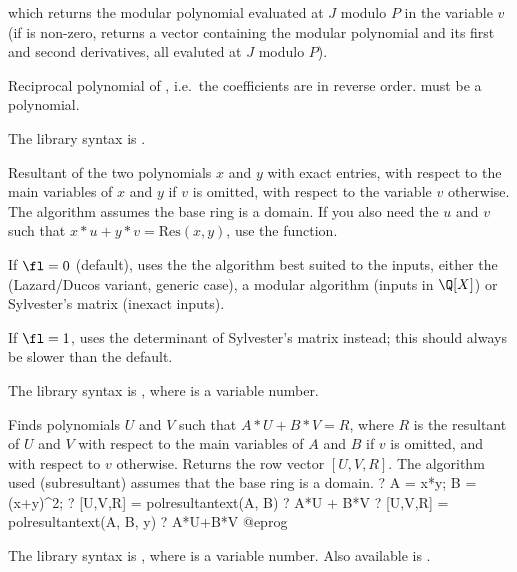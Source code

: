  which returns the modular polynomial evaluated
at $J$ modulo $P$ in the variable $v$ (if  is
non-zero, returns a vector containing the modular polynomial and its
first and second derivatives, all evaluted at $J$ modulo $P$).

\label{se:polrecip}
Reciprocal polynomial of , i.e.~the coefficients are in
reverse order.  must be a polynomial.

The library syntax is .

\label{se:polresultant}
Resultant of the two
polynomials $x$ and $y$ with exact entries, with respect to the main
variables of $x$ and $y$ if $v$ is omitted, with respect to the variable $v$
otherwise. The algorithm assumes the base ring is a domain. If you also need
the $u$ and $v$ such that $x*u + y*v = \text{Res}(x,y)$, use the
 function.

If $\fl=0$ (default), uses the the algorithm best suited to the inputs,
either the  (Lazard/Ducos variant, generic case),
a modular algorithm (inputs in $\Q[X]$) or Sylvester's matrix (inexact
inputs).

If $\fl=1$, uses the determinant of Sylvester's matrix instead; this should
always be slower than the default.

The library syntax is , where  is a variable number.

\label{se:polresultantext}
Finds polynomials $U$ and $V$ such that $A*U + B*V = R$, where $R$ is
the resultant of $U$ and $V$ with respect to the main variables of $A$ and
$B$ if $v$ is omitted, and with respect to $v$ otherwise. Returns the row
vector $[U,V,R]$. The algorithm used (subresultant) assumes that the base
ring is a domain.
\bprog
? A = x*y; B = (x+y)^2;
? [U,V,R] = polresultantext(A, B)
? A*U + B*V
? [U,V,R] = polresultantext(A, B, y)
? A*U+B*V
@eprog

The library syntax is , where  is a variable number.
Also available is
.


